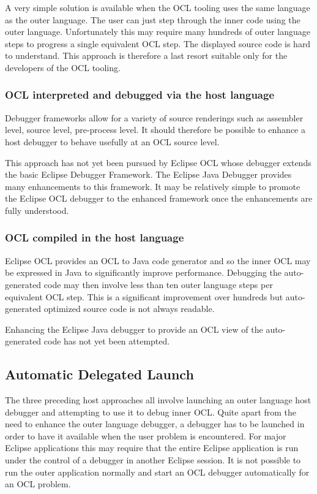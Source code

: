 \documentclass[a4paper]{article}
\begin{document}
A very simple solution is available when the OCL tooling uses the same language as the outer language. The user can just step through the inner code using the outer language. Unfortunately this may require many hundreds of outer language steps to progress a single equivalent OCL step. The displayed source code is hard to understand. This approach is therefore a last resort suitable only for the developers of the OCL tooling.

\subsubsection{OCL interpreted and debugged via the host language}

Debugger frameworks allow for a variety of source renderings such as assembler level, source level, pre-process level. It should therefore be possible to enhance a host debugger to behave usefully at an OCL source level.

This approach has not yet been pursued by Eclipse OCL whose debugger extends the basic Eclipse Debugger Framework. The Eclipse Java Debugger provides many enhancements to this framework. It may be relatively simple to promote the Eclipse OCL debugger to the enhanced framework once the enhancements are fully understood. 

\subsubsection{OCL compiled in the host language}

Eclipse OCL provides an OCL to Java code generator and so the inner OCL may be expressed in Java to significantly improve performance. Debugging the auto-generated code may then involve less than ten outer language steps per equivalent OCL step. This is a significant improvement over hundreds but auto-generated optimized source code is not always readable.

Enhancing the Eclipse Java debugger to provide an OCL view of the auto-generated code has not yet been attempted.

\subsection{Automatic Delegated Launch}

The three preceding host approaches all involve launching an outer language host debugger and attempting to use it to debug inner OCL. Quite apart from the need to enhance the outer language debugger, a debugger has to be launched in order to have it available when the user problem is encountered. For major Eclipse applications this may require that the entire Eclipse application is run under the control of a debugger in another Eclipse session. It is not possible to run the outer application normally and start an OCL debugger automatically for an OCL problem.
\end{document}
